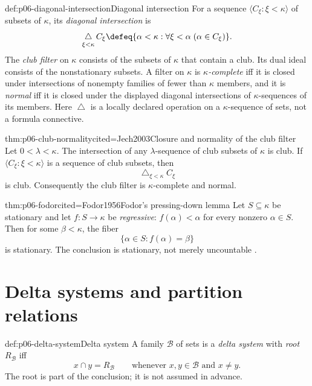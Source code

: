 \begin{hbdefinition}{def:p06-diagonal-intersection}{Diagonal intersection}
For a sequence \(\langle C_\xi:\xi<\kappa\rangle\) of subsets of \(\kappa\),
its \emph{diagonal intersection} is
\[
  \mathop{\triangle}_{\xi<\kappa}C_\xi
  \defeq
  \{\alpha<\kappa:\forall\xi<\alpha\;(\alpha\in C_\xi)\}.
\]
The \emph{club filter} on \(\kappa\) consists of the subsets of \(\kappa\)
that contain a club.  Its dual ideal consists of the nonstationary subsets.
A filter on \(\kappa\) is \emph{\(\kappa\)-complete} iff it is closed under
intersections of nonempty families of fewer than \(\kappa\) members, and it is
\emph{normal} iff it is closed under the displayed diagonal intersections of
\(\kappa\)-sequences of its members.
Here \(\mathop{\triangle}\) is a locally declared operation on a
\(\kappa\)-sequence of sets, not a formula connective.
\end{hbdefinition}

\begin{hbtheorem}{thm:p06-club-normality}{cited=Jech2003}{Closure and normality of the club filter}
Let \(0<\lambda<\kappa\).  The intersection of any
\(\lambda\)-sequence of club subsets of \(\kappa\) is club.  If
\(\langle C_\xi:\xi<\kappa\rangle\) is a sequence of club subsets, then
\[
  \mathop{\triangle}_{\xi<\kappa}C_\xi
\]
is club.  Consequently the club filter is \(\kappa\)-complete and normal.
\end{hbtheorem}

\begin{hbtheorem}{thm:p06-fodor}{cited=Fodor1956}{Fodor's pressing-down lemma}
Let \(S\subseteq\kappa\) be stationary and let \(f:S\to\kappa\) be
\emph{regressive}: \(f(\alpha)<\alpha\) for every nonzero
\(\alpha\in S\).  Then for some \(\beta<\kappa\), the fiber
\[
  \{\alpha\in S:f(\alpha)=\beta\}
\]
is stationary.  The conclusion is stationary, not merely uncountable
\cite{Fodor1956}.
\end{hbtheorem}

\section{Delta systems and partition relations}
\label{sec:p06-delta-ramsey}

\begin{hbdefinition}{def:p06-delta-system}{Delta system}
A family \(\mathcal B\) of sets is a \emph{delta system} with
\emph{root} \(R_{\mathcal B}\) iff
\[
  x\cap y=R_{\mathcal B}
  \qquad
  \text{whenever }x,y\in\mathcal B\text{ and }x\ne y.
\]
The root is part of the conclusion; it is not assumed in advance.
\end{hbdefinition}

